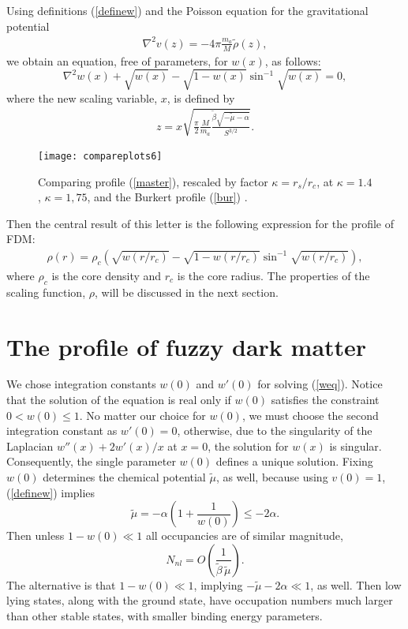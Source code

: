 \documentclass[aps,prl,twocolumn]{revtex4}
\begin{document}
Using definitions (\ref{definew}) and the Poisson equation for the gravitational potential 
\begin{align*}
    \nabla^2v(z)=-4\pi \frac{m_a}{M}\tilde\rho(z),
\end{align*}
we obtain an equation, free of parameters, for $w(x)$, as follows:
\begin{equation}\label{weq}
    \nabla^2w(x)+\sqrt{w(x)}-\sqrt{1-w(x)}\sin^{-1}\sqrt{w(x)}=0,
\end{equation}
where the new scaling variable, $x$, is defined by
\begin{align}\label{relative}
z = x \sqrt{\frac{\pi}{2} \frac{M}{m_a} \frac{\tilde{\beta} \sqrt{-\tilde{\mu} - \alpha}}{S^{3/2}}}.
\end{align}


\begin{figure}[b]
\texttt{[image: compareplots6]}
\caption{\label{density}Comparing  profile (\ref{master}), rescaled by factor $\kappa=r_s/r_c$, at $\kappa=1.4$, $\kappa=1,75$, and the Burkert profile (\ref{bur})
. }
\end{figure}


Then the central result of this letter is the following expression for the profile of FDM:
\begin{align}\label{master}
    \rho(r)=\rho_c \left(\sqrt{w(r/r_c)}-\sqrt{1-w(r/r_c)}\sin^{-1}\sqrt{w(r/r_c)}\right),
\end{align}
where $\rho_c$ is the core density and $r_c$ is the core radius.
The properties of the scaling function,  $\rho$, will be discussed in the next section.
\section{The profile of fuzzy dark matter}\label{sec:FDM_profile}
We chose integration constants $w(0)$ and $w'(0)$ for solving (\ref{weq}). Notice that the solution of  the equation  is real only if $w(0)$ satisfies the constraint $0<w(0)\leq 1$.  No matter our choice for $w(0)$, we must choose the second integration constant as $w'(0)=0$, otherwise, due to the singularity of the Laplacian $w''(x)+2 w'(x)/x$ at $x=0$, the solution for $w(x)$ is singular.  Consequently, the single parameter $w(0)$ defines a unique solution.  Fixing $w(0)$ determines the chemical potential $\tilde\mu$, as well, because using $v(0)=1$, (\ref{definew}) implies
\begin{equation*}
\tilde\mu=-\alpha\left(1+\frac{1}{w(0)}\right)\leq -2\alpha.
\end{equation*}
Then unless $1-w(0)\ll 1$  all occupancies are of similar magnitude,
\begin{equation*}
N_{nl}= O\left(\frac{1}{\tilde\beta\, \tilde\mu}\right).
\end{equation*}
The alternative is that $1-w(0)\ll 1$, implying $-\tilde\mu-2\alpha\ll1$, as well.  Then low lying states, along with  the ground state, have occupation numbers much larger than other stable states, with smaller binding energy parameters.
\end{document}

